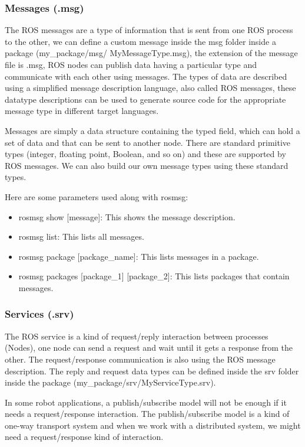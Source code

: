 	\subsubsection{Messages (.msg)}
	
	The ROS messages are a type of information that is sent from one ROS process to the other, we can define a custom message inside the msg folder inside a package (my\_package/msg/ MyMessageType.msg), the extension of the message file is .msg, ROS nodes can publish data having a particular type and communicate with each other using messages.
	The types of data are described using a simplified message description language, also called ROS messages, these datatype descriptions can be used to generate source code for the appropriate message type in different target languages.
	
	 Messages are simply a data structure containing the typed field, which can hold a set of data and that can be sent to another node. There are standard primitive types (integer, floating point, Boolean, and so on) and these are supported by ROS messages. We can also build our own message types using these standard types.
	 
	 Here are some parameters used along with rosmsg:
	 \begin{itemize}
	 	\item rosmsg show [message]: This shows the message description. 
	 	\item rosmsg list: This lists all messages. 
	 	\item rosmsg package [package\_name]: This lists messages in a package.
	 	\item rosmsg packages [package\_1] [package\_2]: This lists packages that contain messages.
	 \end{itemize}
 	\subsubsection{Services (.srv)}
 	The ROS service is a kind of request/reply interaction between processes (Nodes), one node can send a request and wait until it gets a response from the other.
 	The request/response communication is also using the ROS message description. 
 	The reply and request data types can be defined inside the srv folder inside the package (my\_package/srv/MyServiceType.srv).
 	
 	In some robot applications, a publish/subscribe model will not be enough if it needs a request/response interaction. The publish/subscribe model is a kind of one-way transport system and when we work with a distributed system, we might need a request/response kind of interaction.
 	
